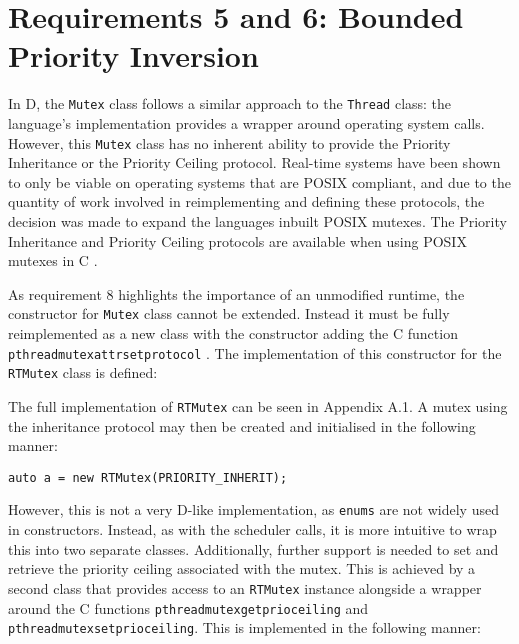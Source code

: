 \section{Requirements 5 and 6: Bounded Priority Inversion}
In D, the \texttt{Mutex} class follows a similar approach to the \texttt{Thread}
class: the language's implementation provides a wrapper around operating system 
calls. However, this \texttt{Mutex} class has no 
inherent ability to provide the Priority Inheritance or the Priority Ceiling protocol. 
Real-time systems have been shown to only be viable on operating systems that 
are POSIX compliant, and due to the quantity of work involved in reimplementing 
and defining these protocols, the decision was made to expand the languages
inbuilt POSIX mutexes. The Priority Inheritance and Priority Ceiling protocols 
are available when using POSIX mutexes in C \cite{mutex-setprotocol}. 
\par\bigskip\noindent
As requirement 8 highlights the importance of an unmodified runtime, the 
constructor for \texttt{Mutex} class cannot be extended. Instead it must be fully 
reimplemented as a new class with the constructor adding 
the C function \texttt{pthread\textunderscore{}mutexattr\textunderscore{}setprotocol} 
\cite{mutex-setprotocol}. 
The implementation of this constructor for the \texttt{RTMutex} class is defined:

The full implementation of \texttt{RTMutex} can be seen in Appendix A.1. 
A mutex using the inheritance protocol may then be created and initialised in 
the following manner: 
\begin{lstlisting}[basicstyle=\small]
auto a = new RTMutex(PRIORITY_INHERIT);
\end{lstlisting}
However, this is not a very D-like implementation, as \texttt{enums} are not widely used 
in constructors. Instead, as with the scheduler calls, 
it is more intuitive to wrap this into two separate classes. Additionally, 
further support 
is needed to set and retrieve the priority ceiling associated with the 
mutex. 
This is achieved by a second class that provides access to an \texttt{RTMutex}
instance alongside a wrapper around the C functions 
\texttt{pthread\textunderscore{}mutex\textunderscore{}getprioceiling} and 
\texttt{pthread\textunderscore{}mutex\textunderscore{}setprioceiling}.
This is implemented in the following manner: 
